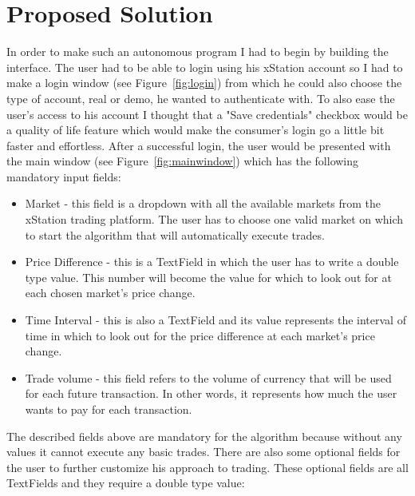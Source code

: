 \documentclass[12pt,a4paper]{report}
\begin{document}
\chapter{Proposed Solution}
In order to make such an autonomous program I had to begin by building the interface. The user had to be able to login using his xStation account so I had to make a login window (see Figure~\ref{fig:login}) from which he could also choose the type of account, real or demo, he wanted to authenticate with. To also ease the user's access to his account I thought that a "Save credentials" checkbox would be a quality of life feature which would make the consumer's login go a little bit faster and effortless. After a successful login, the user would be presented with the main window (see Figure~\ref{fig:mainwindow}) which has the following mandatory input fields:
\begin{itemize}
	\item Market - this field is a dropdown with all the available markets from the xStation trading platform. The user has to choose one valid market on which to start the algorithm that will automatically execute trades. 
	\item Price Difference - this is a TextField in which the user has to write a double type value. This number will become the value for which to look out for at each chosen market's price change.
	\item Time Interval - this is also a TextField and its value represents the interval of time in which to look out for the price difference at each market's price change.
	\item Trade volume - this field refers to the volume of currency that will be used for each future transaction. In other words, it represents how much the user wants to pay for each transaction.
\end{itemize}
The described fields above are mandatory for the algorithm because without any values it cannot execute any basic trades. There are also some optional fields for the user to further customize his approach to trading. These optional fields are all TextFields and they require a double type value:
\end{document}

